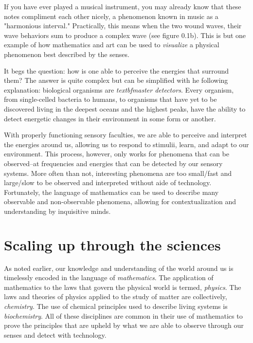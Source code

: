 \documentclass[12pt]{ucsddissertation}
\begin{document}
\begin{dissertationintroduction}
If you have ever played a musical instrument, you may already know that these notes compliment each other nicely, a phenomenon known in music as a "harmonious interval." Practically, this means when the two wound waves, their wave behaviors sum to produce a complex wave (see figure 0.1b). This is but one example of how mathematics and art can be used to \textit{visualize} a physical phenomenon best described by the senses.

It begs the question: how is one able to perceive the energies that surround them? The answer is quite complex but can be simplified with he following explanation: biological organisms are \textit{textbf{master detectors}}. Every organism, from single-celled bacteria to humans, to organisms that have yet to be discovered living in the deepest oceans and the highest peaks, have the ability to detect energetic changes in their environment in some form or another. 

With properly functioning sensory faculties, we are able to perceive and interpret the energies around us, allowing us to respond to stimulii, learn, and adapt to our environment. This process, however, only works for phenomena that can be observed--at frequencies and energies that can be detected by our sensory systems. More often than not, interesting phenomena are too small/fast and large/slow to be observed and interpreted without aide of technology. Fortunately, the language of mathematics can be used to describe many observable and non-observable phenomena, allowing for contextualization and understanding by inquisitive minds.

\section{Scaling up through the sciences}
As noted earlier, our knowledge and understanding of the world around us is timelessly encoded in the language of \textit{mathematics}. The application of mathematics to the laws that govern the physical world is termed, \textit{physics}. The laws and theories of physics applied to the study of matter are collectively, \textit{chemistry}. The use of chemical principles used to describe living systems is \textit{biochemistry}. All of these disciplines are common in their use of mathematics to prove the principles that are upheld by what we are able to observe through our senses and detect with technology. 


\end{dissertationintroduction}
\end{document}
